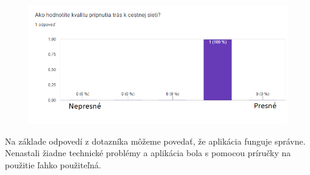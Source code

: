 \begin{figure}[H]
  \centering
  \includegraphics[width=.7\textwidth]{img/dotaznik/11.png}
\end{figure}

Na základe odpovedí z dotazníka môžeme povedať, že aplikácia funguje správne. Nenastali žiadne technické problémy a aplikácia bola s pomocou príručky na použitie ľahko použiteľná. 